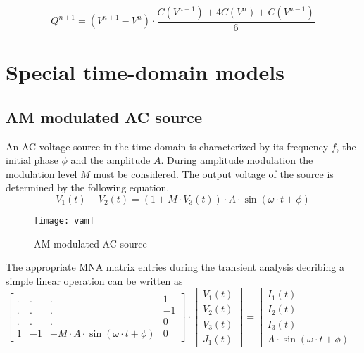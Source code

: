 \begin{equation}
Q^{n+1} = \left(V^{n+1} - V^{n}\right)\cdot \dfrac{C(V^{n+1}) + 4 C(V^{n}) + C(V^{n-1})}{6}
\end{equation}

\section{Special time-domain models}

\subsection{AM modulated AC source}

An AC voltage source in the time-domain is characterized by its
frequency $f$, the initial phase $\phi$ and the amplitude $A$.  During
amplitude modulation the modulation level $M$ must be considered.  The
output voltage of the source is determined by the following equation.
\begin{equation}
V_1\left(t\right) - V_2\left(t\right) = \left(1 + M\cdot V_3\left(t\right)\right)\cdot A\cdot \sin{\left(\omega\cdot t + \phi\right)}
\end{equation}

\begin{figure}[ht]
\begin{center}
\texttt{[image: vam]}
\end{center}
\label{fig:VAM}
\caption{AM modulated AC source}
\end{figure}
\FloatBarrier

The appropriate MNA matrix entries during the transient analysis
decribing a simple linear operation can be written as
\begin{equation}
\begin{bmatrix}
. & . & . & 1\\
. & . & . & -1\\
. & . & . & 0\\
1 & -1 & -M\cdot A\cdot \sin{\left(\omega\cdot t + \phi\right)} & 0
\end{bmatrix}
\cdot
\begin{bmatrix}
V_1\left(t\right)\\
V_2\left(t\right)\\
V_3\left(t\right)\\
J_1\left(t\right)
\end{bmatrix}
=
\begin{bmatrix}
I_1\left(t\right)\\
I_2\left(t\right)\\
I_3\left(t\right)\\
A\cdot \sin{\left(\omega\cdot t + \phi\right)}
\end{bmatrix}
\end{equation}


